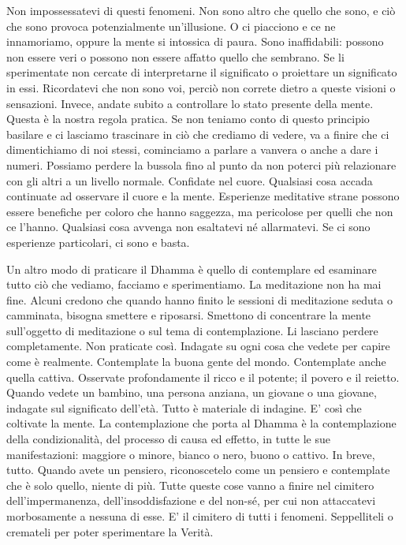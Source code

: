 Non impossessatevi di questi fenomeni. Non sono altro che quello che
sono, e ciò che sono provoca potenzialmente un'illusione. O ci piacciono
e ce ne innamoriamo, oppure la mente si intossica di paura. Sono
inaffidabili: possono non essere veri o possono non essere affatto
quello che sembrano. Se li sperimentate non cercate di interpretarne il
significato o proiettare un significato in essi. Ricordatevi che non
sono voi, perciò non correte dietro a queste visioni o sensazioni.
Invece, andate subito a controllare lo stato presente della mente.
Questa è la nostra regola pratica. Se non teniamo conto di questo
principio basilare e ci lasciamo trascinare in ciò che crediamo di
vedere, va a finire che ci dimentichiamo di noi stessi, cominciamo a
parlare a vanvera o anche a dare i numeri. Possiamo perdere la bussola
fino al punto da non poterci più relazionare con gli altri a un livello
normale. Confidate nel cuore. Qualsiasi cosa accada continuate ad
osservare il cuore e la mente. Esperienze meditative strane possono
essere benefiche per coloro che hanno saggezza, ma pericolose per quelli
che non ce l'hanno. Qualsiasi cosa avvenga non esaltatevi né
allarmatevi. Se ci sono esperienze particolari, ci sono e basta.

Un altro modo di praticare il Dhamma è quello di contemplare ed
esaminare tutto ciò che vediamo, facciamo e sperimentiamo. La
meditazione non ha mai fine. Alcuni credono che quando hanno finito le
sessioni di meditazione seduta o camminata, bisogna smettere e
riposarsi. Smettono di concentrare la mente sull'oggetto di meditazione
o sul tema di contemplazione. Li lasciano perdere completamente. Non
praticate così. Indagate su ogni cosa che vedete per capire come è
realmente. Contemplate la buona gente del mondo. Contemplate anche
quella cattiva. Osservate profondamente il ricco e il potente; il povero
e il reietto. Quando vedete un bambino, una persona anziana, un giovane
o una giovane, indagate sul significato dell'età. Tutto è materiale di
indagine. E' così che coltivate la mente. La contemplazione che porta al
Dhamma è la contemplazione della condizionalità, del processo di causa
ed effetto, in tutte le sue manifestazioni: maggiore o minore, bianco o
nero, buono o cattivo. In breve, tutto. Quando avete un pensiero,
riconoscetelo come un pensiero e contemplate che è solo quello, niente
di più. Tutte queste cose vanno a finire nel cimitero dell'impermanenza,
dell'insoddisfazione e del non-sé, per cui non attaccatevi morbosamente
a nessuna di esse. E' il cimitero di tutti i fenomeni. Seppelliteli o
cremateli per poter sperimentare la Verità.

